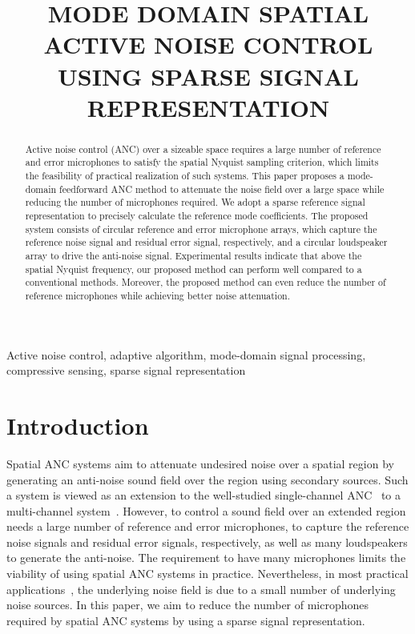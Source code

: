 \documentclass{article}
\title{MODE DOMAIN SPATIAL ACTIVE NOISE CONTROL USING SPARSE SIGNAL REPRESENTATION}
\begin{document}
\ninept
%
\maketitle
%
\begin{abstract}
Active noise control (ANC) over a sizeable space requires a large number of reference and error microphones to satisfy the spatial Nyquist sampling criterion, which limits the feasibility of practical realization of such systems. This paper proposes a mode-domain feedforward ANC method to attenuate the noise field over a large space while reducing the number of microphones required.
We adopt a sparse reference signal representation to precisely calculate the reference mode coefficients. The proposed system consists of circular reference and error microphone arrays, which capture the reference noise signal and residual error signal, respectively,
and a circular loudspeaker array to drive the anti-noise signal.
Experimental results indicate that above the spatial Nyquist frequency,
our proposed method can perform well compared to a conventional methods.
Moreover, the proposed method can even reduce the number of reference microphones while achieving better noise attenuation.
\end{abstract}
%
\begin{keywords}
Active noise control, adaptive algorithm, mode-domain signal processing, compressive sensing, sparse signal representation
\end{keywords}
%
\section{Introduction}
\label{sec:intro}
Spatial ANC systems aim to attenuate undesired noise over a spatial region by generating an anti-noise sound field over the region using secondary sources.  Such a system is viewed as an extension to the well-studied single-channel ANC~\cite{kuo1995active,kuo1999active,kajikawa2012recent} to a multi-channel system~\cite{kuo1995active,elliott1987multiple}. However, to control a sound field over an extended region needs a large number of reference and error microphones, to capture the reference noise signals and residual error signals, respectively, as well as many loudspeakers to generate the anti-noise.  The requirement to have many microphones limits the viability of using spatial ANC systems in practice. 
Nevertheless, in most practical
applications~\cite{chen2015spatial,samarasinghe2016recent},
the underlying noise field is due to a small number of underlying noise sources.  In this paper, we aim to reduce the number of microphones required by spatial ANC systems by using a sparse signal representation.
\end{document}
